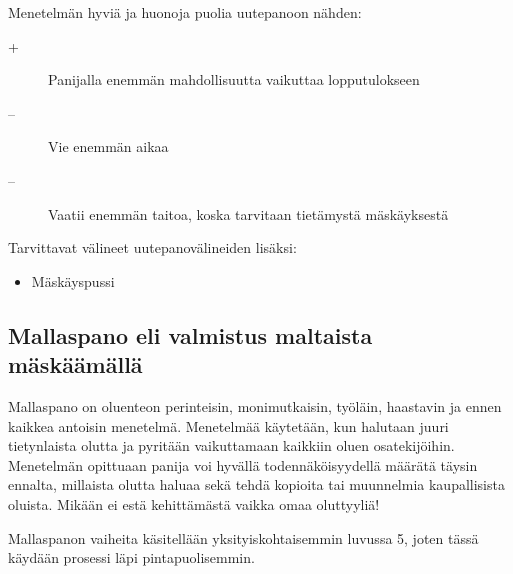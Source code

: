 \documentclass[a4paper,11pt]{report}
\begin{document}
Menetelmän hyviä ja huonoja puolia uutepanoon nähden:

\begin{description}
\item[+] Panijalla enemmän mahdollisuutta vaikuttaa lopputulokseen
\item[--] Vie enemmän aikaa
\item[--] Vaatii enemmän taitoa, koska tarvitaan tietämystä mäskäyksestä 
\end{description}
Tarvittavat välineet uutepanovälineiden lisäksi:
\begin{itemize}
\item Mäskäyspussi
\end{itemize}
\subsection{Mallaspano eli valmistus maltaista mäskäämällä}

Mallaspano on oluenteon perinteisin, monimutkaisin, työläin, haastavin ja ennen kaikkea antoisin menetelmä. Menetelmää käytetään, kun halutaan juuri tietynlaista olutta ja pyritään vaikuttamaan kaikkiin oluen osatekijöihin. Menetelmän opittuaan panija voi hyvällä todennäköisyydellä määrätä täysin ennalta, millaista olutta haluaa sekä tehdä kopioita tai muunnelmia kaupallisista oluista. Mikään ei estä kehittämästä vaikka omaa oluttyyliä!

Mallaspanon vaiheita käsitellään yksityiskohtaisemmin luvussa 5, joten tässä käydään prosessi läpi pintapuolisemmin.
\end{document}
